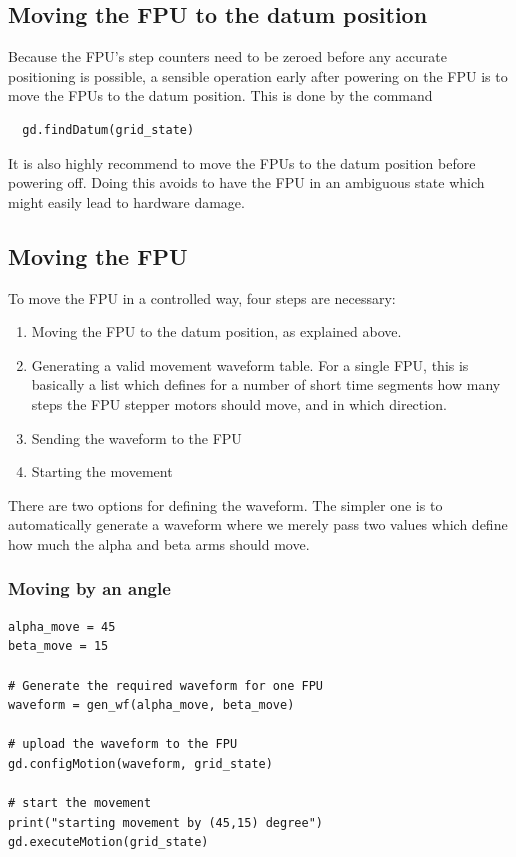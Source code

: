 \documentclass{scrartcl}[12pt,a4paper]
\begin{document}
\subsection{Moving the FPU to the datum position}

Because the FPU's step counters need to be zeroed
before any accurate positioning is possible, a
sensible operation early after powering on
the FPU is to move the FPUs to the datum position.
This is done by the command

\begin{verbatim}
  gd.findDatum(grid_state)
\end{verbatim}

It is also highly recommend to move the FPUs to the datum position
before powering off. Doing this avoids to have the FPU in an ambiguous
state which might easily lead to hardware damage.

\subsection{Moving the FPU}

To move the FPU in a controlled way,
four steps are necessary:

\begin{enumerate}
\item Moving the FPU to the datum position, as explained above.

\item Generating a valid movement waveform table. For a single FPU,
  this is basically a list which defines for a number of short time
  segments how many steps the FPU stepper motors should move, and in
  which direction.

\item Sending the waveform to the FPU
\item Starting the movement
  
\end{enumerate}

There are two options for defining the waveform. The simpler one is to
automatically generate a waveform where we merely pass two values
which define how much the alpha and beta arms should move.

\subsubsection{Moving by an angle}

\begin{verbatim}
alpha_move = 45
beta_move = 15

# Generate the required waveform for one FPU
waveform = gen_wf(alpha_move, beta_move)

# upload the waveform to the FPU
gd.configMotion(waveform, grid_state)

# start the movement
print("starting movement by (45,15) degree")
gd.executeMotion(grid_state)
\end{verbatim}
\end{document}
